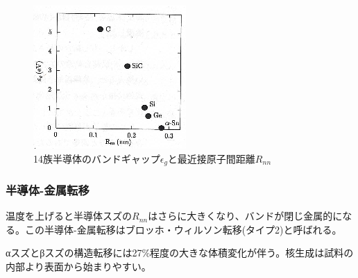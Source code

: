 \begin{figure}[!h]
\begin{minipage}{0.6\hsize}
  \begin{center}
   \includegraphics[width=\hsize]{Introduction/bandgaps.eps}
  \end{center}
  \caption{14族半導体のバンドギャップ$\epsilon_g$と最近接原子間距離$R_{nn}$\cite{Yonezawa}}
  \label{fig:bandgaps}
 \end{minipage}
\end{figure}


\subsubsection{半導体-金属転移}
温度を上げると半導体スズの$R_{nn}$はさらに大きくなり、バンドが閉じ金属的になる。この半導体-金属転移はブロッホ・ウィルソン転移(タイプ2)と呼ばれる\cite{Yonezawa}。

αスズとβスズの構造転移には27\%程度の大きな体積変化が伴う。核生成は試料の内部より表面から始まりやすい\cite{Cornelius}。

